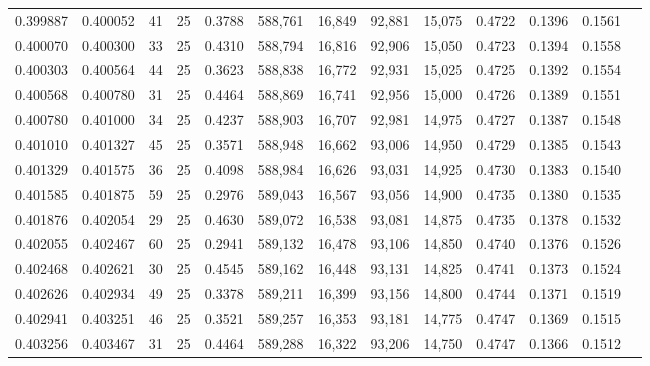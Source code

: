 \begin{tabular}{rrrrrrrrrrrrr}
0.399887 & 0.400052 &    41 &  25 &                                     0.3788 & 588,761 &  16,849 &  92,881 &  15,075 & 0.4722 & 0.1396 & 0.1561 \\
0.400070 & 0.400300 &    33 &  25 &                                     0.4310 & 588,794 &  16,816 &  92,906 &  15,050 & 0.4723 & 0.1394 & 0.1558 \\
0.400303 & 0.400564 &    44 &  25 &                                     0.3623 & 588,838 &  16,772 &  92,931 &  15,025 & 0.4725 & 0.1392 & 0.1554 \\
0.400568 & 0.400780 &    31 &  25 &                                     0.4464 & 588,869 &  16,741 &  92,956 &  15,000 & 0.4726 & 0.1389 & 0.1551 \\
0.400780 & 0.401000 &    34 &  25 &                                     0.4237 & 588,903 &  16,707 &  92,981 &  14,975 & 0.4727 & 0.1387 & 0.1548 \\
0.401010 & 0.401327 &    45 &  25 &                                     0.3571 & 588,948 &  16,662 &  93,006 &  14,950 & 0.4729 & 0.1385 & 0.1543 \\
0.401329 & 0.401575 &    36 &  25 &                                     0.4098 & 588,984 &  16,626 &  93,031 &  14,925 & 0.4730 & 0.1383 & 0.1540 \\
0.401585 & 0.401875 &    59 &  25 &                                     0.2976 & 589,043 &  16,567 &  93,056 &  14,900 & 0.4735 & 0.1380 & 0.1535 \\
0.401876 & 0.402054 &    29 &  25 &                                     0.4630 & 589,072 &  16,538 &  93,081 &  14,875 & 0.4735 & 0.1378 & 0.1532 \\
0.402055 & 0.402467 &    60 &  25 &                                     0.2941 & 589,132 &  16,478 &  93,106 &  14,850 & 0.4740 & 0.1376 & 0.1526 \\
0.402468 & 0.402621 &    30 &  25 &                                     0.4545 & 589,162 &  16,448 &  93,131 &  14,825 & 0.4741 & 0.1373 & 0.1524 \\
0.402626 & 0.402934 &    49 &  25 &                                     0.3378 & 589,211 &  16,399 &  93,156 &  14,800 & 0.4744 & 0.1371 & 0.1519 \\
0.402941 & 0.403251 &    46 &  25 &                                     0.3521 & 589,257 &  16,353 &  93,181 &  14,775 & 0.4747 & 0.1369 & 0.1515 \\
0.403256 & 0.403467 &    31 &  25 &                                     0.4464 & 589,288 &  16,322 &  93,206 &  14,750 & 0.4747 & 0.1366 & 0.1512 \\

\end{tabular}
